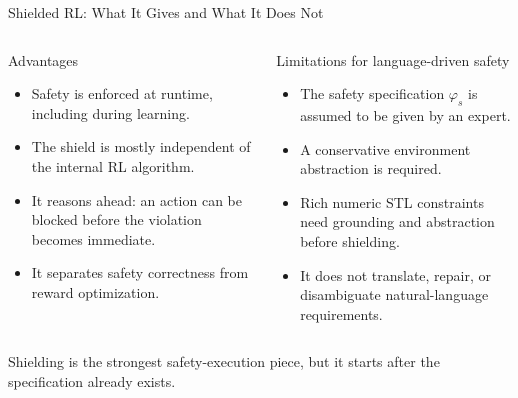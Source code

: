\documentclass[aspectratio=169]{beamer}
\begin{document}
\begin{frame}{Shielded RL: What It Gives and What It Does Not}
\begin{columns}[T]
\begin{block}{Advantages}
\small
\begin{itemize}
  \item Safety is enforced at runtime, including during learning.
  \item The shield is mostly independent of the internal RL algorithm.
  \item It reasons ahead: an action can be blocked before the violation becomes immediate.
  \item It separates safety correctness from reward optimization.
\end{itemize}
\end{block}

\begin{block}{Limitations for language-driven safety}
\small
\begin{itemize}
  \item The safety specification \(\varphi_s\) is assumed to be given by an expert.
  \item A conservative environment abstraction is required.
  \item Rich numeric STL constraints need grounding and abstraction before shielding.
  \item It does not translate, repair, or disambiguate natural-language requirements.
\end{itemize}
\end{block}
\end{columns}

\vspace{0.35em}
\begin{center}
\small
Shielding is the strongest safety-execution piece, but it starts after the specification already exists.
\end{center}
\end{frame}
\end{document}

